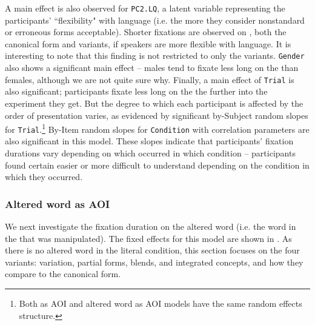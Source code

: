 \documentclass[output=paper
,modfonts
,nonflat]{langsci/langscibook}
\begin{document}
A main effect is also observed for \texttt{PC2.LQ}, a latent variable representing the participants' ``flexibility" with language (i.e. the more they consider nonstandard or erroneous forms acceptable).  Shorter fixations are observed on , both the canonical form and variants, if speakers are more flexible with language. It is interesting to note that this finding is not  restricted to only the variants. \texttt{Gender} also shows a significant main effect -- males tend to fixate less long on the  than females, although we are not quite sure why. Finally, a main effect of \texttt{Trial} is also significant; participants fixate less long on the  the further into the experiment they get. But the degree to which each participant is affected by the order of presentation varies, as evidenced by significant by-Subject random slopes for \texttt{Trial}.\footnote{Both  as AOI and altered word as AOI models have the same random effects structure.} By-Item random slopes for \texttt{Condition} with correlation parameters are also significant in this model. These slopes indicate that participants' fixation durations vary depending on which  occurred in which condition -- participants found certain  easier or more difficult to understand  depending on the condition in which they occurred. 



\subsubsection{Altered word as AOI}

We next investigate the fixation duration on the altered word (i.e. the word in the   that was manipulated). The fixed effects for this model are shown in . As there is no altered word in the literal condition, this section focuses on the four  variants:  variation, partial forms,   blends, and integrated  concepts, and how they compare to the canonical form. 
\end{document}
